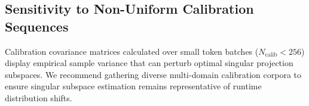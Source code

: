 \subsection{Sensitivity to Non-Uniform Calibration Sequences}
Calibration covariance matrices calculated over small token batches ($N_{\text{calib}} < 256$) display empirical sample variance that can perturb optimal singular projection subspaces. We recommend gathering diverse multi-domain calibration corpora to ensure singular subspace estimation remains representative of runtime distribution shifts.
